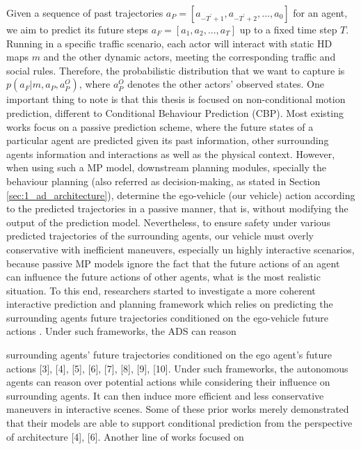Given a sequence of past trajectories $a_{P}=[a_{-T^{'}+1},a_{-T^{'}+2},...,a_{0}]$ for an agent, we aim to predict its future steps $a_{F}=[a_{1},a_{2},...,a_{T}]$ up to a fixed time step $T$. Running in a specific traffic scenario, each actor will interact with static HD maps $m$ and the other dynamic actors, meeting the corresponding traffic and social rules. Therefore, the probabilistic distribution that we want to capture is $p(a_F|m, a_P, a^O_P)$, where $a^O_P$ denotes the other actors' observed states. One important thing to note is that this thesis is focused on non-conditional motion prediction, different to Conditional Behaviour Prediction (CBP). Most existing works focus on a passive prediction scheme, where the future states of a particular agent are predicted given its past information, other surrounding agents information and interactions as well as the physical context. However, when using such a \ac{MP} model, downstream planning modules, specially the behaviour planning (also referred as decision-making, as stated in Section \ref{sec:1_ad_architecture}), determine the ego-vehicle (our vehicle) action according to the predicted trajectories in a passive manner, that is, without modifying the output of the prediction model. Nevertheless, to ensure safety under various predicted trajectories of the surrounding agents, our vehicle must overly conservative with inefficient maneuvers, especially un highly interactive scenarios, because passive \ac{MP} models ignore the fact that the future actions of an agent can influence the future actions of other agents, what is the most realistic situation. To this end, researchers started to investigate a more coherent interactive prediction and planning framework which relies on predicting the surrounding agents future trajectories conditioned on the ego-vehicle future actions \cite{tang2019multiple} \cite{rhinehart2019precog} \cite{khandelwal2020if}. Under such frameworks, the \acs{ADS} can reason 

surrounding agents’ future trajectories conditioned on the
ego agent’s future actions [3], [4], [5], [6], [7], [8], [9], [10].
Under such frameworks, the autonomous agents can reason
over potential actions while considering their influence on
surrounding agents. It can then induce more efficient and
less conservative maneuvers in interactive scenes. Some of
these prior works merely demonstrated that their models are
able to support conditional prediction from the perspective
of architecture [4], [6]. Another line of works focused on


